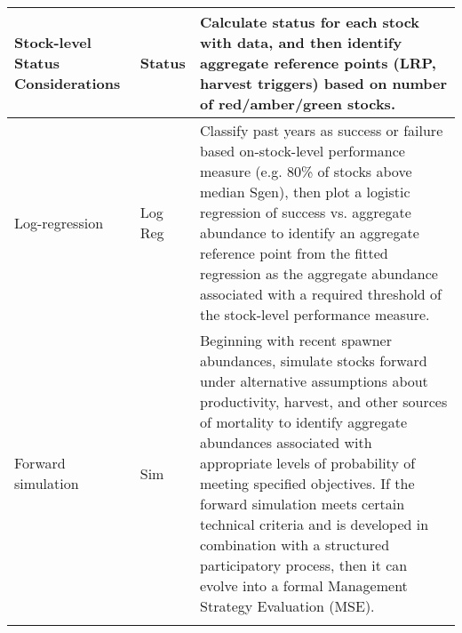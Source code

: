 \documentclass[french,11pt]{book}
\begin{document}
\begin{longtable}[t]{>{\raggedright\arraybackslash}p{8em}>{\raggedright\arraybackslash}p{6em}>{\raggedright\arraybackslash}p{32em}}
\midrule Stock-level Status Considerations & Status & Calculate status for each stock with data, and then identify aggregate reference points (LRP, harvest triggers) based on number of red/amber/green stocks.\\
\midrule Log-regression & Log Reg & Classify past years as success or failure based on-stock-level performance measure (e.g. 80\% of stocks above median Sgen), then plot a logistic regression of success vs. aggregate abundance to identify an aggregate reference point from the fitted regression as the aggregate abundance associated with a required threshold of the stock-level performance measure.\\
\midrule Forward simulation & Sim & Beginning with recent spawner abundances, simulate stocks forward under alternative assumptions about productivity, harvest, and other sources of mortality to identify aggregate abundances associated with appropriate levels of probability of meeting specified objectives. If the forward simulation meets certain technical criteria and is developed in combination with a structured participatory process, then it can evolve into a formal Management Strategy Evaluation (MSE).\\* \end{longtable}

\endgroup{} \endgroup{}

\clearpage
\end{document}
